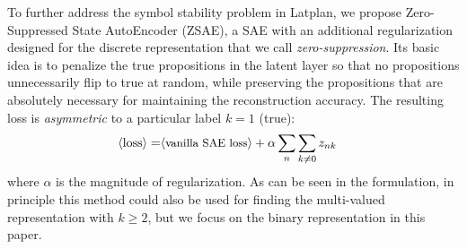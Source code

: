 To further address the symbol stability problem in Latplan,
we propose Zero-Suppressed State AutoEncoder (ZSAE),
a SAE with an additional regularization designed for the discrete representation that we call \emph{zero-suppression}.
% 
Its basic idea is to penalize the
true propositions in the latent layer so that no propositions unnecessarily flip to true at random,
while preserving the propositions that are absolutely necessary for maintaining the reconstruction accuracy.
% 
The resulting loss is 
\emph{asymmetric} to a particular label $k=1$ (true):
\begin{align*}
 \brackets{\text{loss}} = & \brackets{\text{\small vanilla SAE loss}} + \alpha \sum_n \sum_{k\not=0} z_{nk} %
\end{align*}
where $\alpha$ is the magnitude of regularization.
As can be seen in the formulation, in principle this method could also be used for finding the multi-valued representation
with $k\geq 2$, but we focus on the binary representation in this paper.

